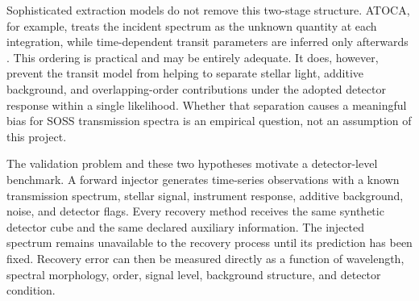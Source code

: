 
Sophisticated extraction models do not remove this two-stage structure.
ATOCA, for example, treats the incident spectrum as the unknown quantity at
each integration, while time-dependent transit parameters are inferred only
afterwards
\citep{DarveauBernierEtAl2022,BellEtAl2022,RadicaEtAl2023}. This ordering is
practical and may be entirely adequate. It does, however, prevent the transit
model from helping to separate stellar light, additive background, and
overlapping-order contributions under the adopted detector response within a
single likelihood. Whether that separation causes a meaningful bias
for SOSS transmission spectra is an empirical question, not an assumption of
this project.


The validation problem and these two hypotheses motivate a detector-level
benchmark. A forward injector generates time-series observations with a known
transmission spectrum, stellar signal, instrument response, additive
background, noise, and detector flags. Every recovery method receives the same
synthetic detector cube and the same declared auxiliary information. The
injected spectrum remains unavailable to the recovery process until its
prediction has been fixed. Recovery error can then be measured directly as a
function of wavelength, spectral morphology, order, signal level, background
structure, and detector condition.


